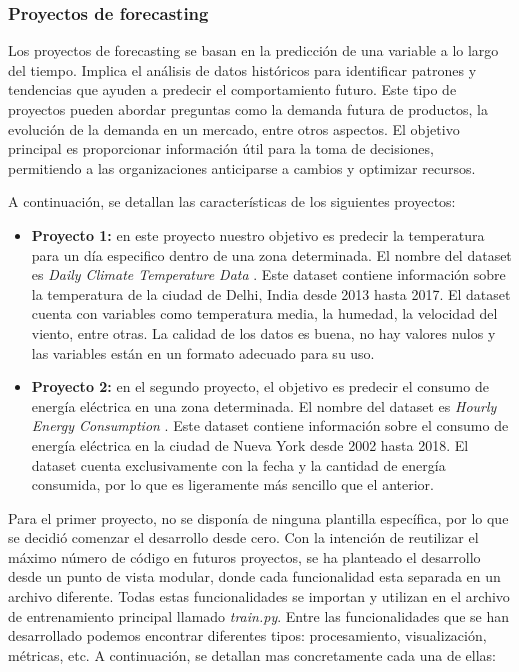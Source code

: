 \subsubsection{Proyectos de forecasting}
Los proyectos de forecasting se basan en la predicción de una variable a lo largo del tiempo.
Implica el análisis de datos históricos para identificar patrones y tendencias que ayuden 
a predecir el comportamiento futuro. Este tipo de proyectos pueden abordar preguntas como la 
demanda futura de productos, la evolución de la demanda en un mercado, entre otros aspectos. 
El objetivo principal es proporcionar información útil para la toma de decisiones, permitiendo a 
las organizaciones anticiparse a cambios y optimizar recursos.\medskip

A continuación, se detallan las características de los siguientes proyectos:
\begin{itemize}
    \item \textbf{Proyecto 1:} en este proyecto nuestro objetivo es predecir 
    la temperatura para un día especifico dentro de una zona determinada. 
     El nombre del dataset es \textit{Daily Climate Temperature Data}
    \cite{Daily_Climate}. Este dataset contiene información sobre la temperatura
    de la ciudad de Delhi, India desde 2013 hasta 2017. El dataset cuenta con
    variables como temperatura media, la humedad, la velocidad del viento, entre otras.
    La calidad de los datos es buena, no hay valores nulos y las variables están
    en un formato adecuado para su uso.
    \item \textbf{Proyecto 2:} en el segundo proyecto, el objetivo es predecir
    el consumo de energía eléctrica en una zona determinada. El nombre del dataset
    es \textit{Hourly Energy Consumption} \cite{Mulla_2018}. Este dataset contiene
    información sobre el consumo de energía eléctrica en la ciudad de Nueva York desde
    2002 hasta 2018. El dataset cuenta exclusivamente con la fecha y la cantidad de energía
    consumida, por lo que es ligeramente más sencillo que el anterior.
\end{itemize}

Para el primer proyecto, no se disponía de ninguna plantilla específica, por lo que se 
decidió comenzar el desarrollo desde cero. Con la intención de reutilizar el máximo
número de código en futuros proyectos, se ha planteado el desarrollo desde un punto
de vista modular, donde cada funcionalidad esta separada en un archivo diferente.
Todas estas funcionalidades se importan y utilizan en el archivo de entrenamiento
principal llamado \textit{train.py}. Entre las funcionalidades que se han desarrollado
podemos encontrar diferentes tipos: procesamiento, visualización, métricas, etc. A continuación,
se detallan mas concretamente cada una de ellas:

